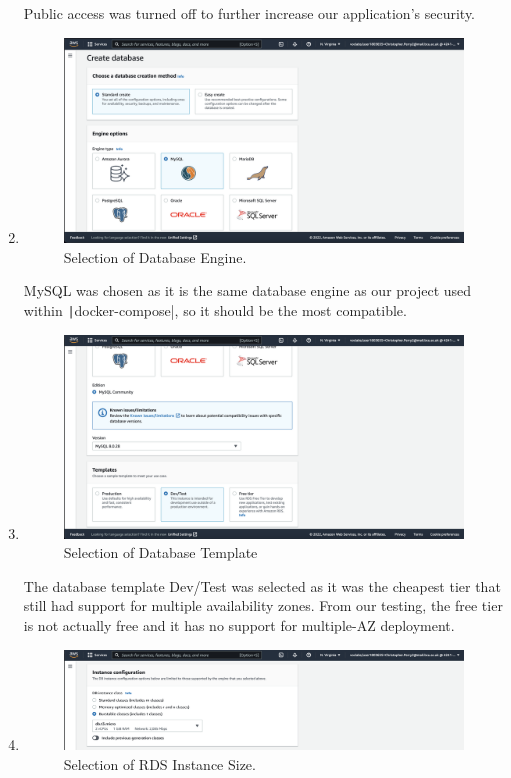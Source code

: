 \begin{enumerate}
    Public access was turned off to further increase our application's security.

    \item
    \begin{figure}[H]
        \centering
        \includegraphics[width=\textwidth]{resources/rds/rds-create-engine}
        \caption{Selection of Database Engine.}
        \label{fig:rds-engine}
    \end{figure}
    MySQL was chosen as it is the same database engine as our project used within \texttt|docker-compose|, so it should be the most compatible.

    \item
    \begin{figure}[H]
        \centering
        \includegraphics[width=\textwidth]{resources/rds/rds-templates}
        \caption{Selection of Database Template}
        \label{fig:rds-templates}
    \end{figure}
    The database template Dev/Test was selected as it was the cheapest tier that still had support for multiple availability zones. From our testing, the free tier is not actually free and it has no support for multiple-AZ deployment.

    \item
    \begin{figure}[H]
        \centering
        \includegraphics[width=\textwidth]{resources/rds/rds-instance-config}
        \caption{Selection of RDS Instance Size.}
        \label{fig:rds-instance-conf}
    \end{figure}


\end{enumerate}
